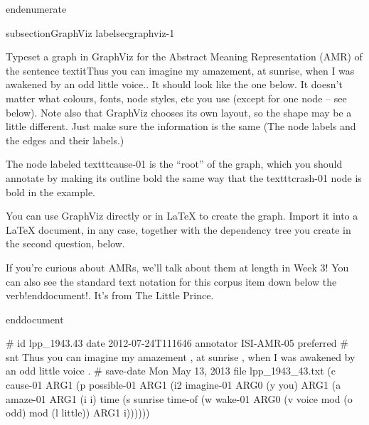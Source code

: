 end{enumerate}


subsection{GraphViz}
label{secgraphviz-1}

Typeset a graph in GraphViz for the Abstract Meaning Representation (AMR) of the sentence textit{Thus you can imagine my amazement, at sunrise, when I was awakened by an odd little voice.}. It should look  like the one below. It doesn’t matter what colours, fonts, node styles, etc you use (except for one node -- see below). Note also that GraphViz chooses its own layout, so the shape may be a little different. Just make sure the information is the same (The node labels and the edges and their labels.)

The node labeled texttt{cause-01} is the ``root'' of the graph, which you should annotate by making its outline bold the same way that the texttt{crash-01} node is bold in the example.

You can use GraphViz directly or in LaTeX{} to create the graph. Import it into a LaTeX{} document, in any case, together with the dependency tree you create in the second question, below.



If you're curious about AMRs, we'll talk about them at length in Week 3! You can also see the standard text notation for this corpus item down below the verb!end{document}!. It's from The Little Prince.


end{document}




# id lpp_1943.43 date 2012-07-24T111646 annotator ISI-AMR-05 preferred
# snt Thus you can imagine my amazement , at sunrise , when I was awakened by an odd little voice .
# save-date Mon May 13, 2013 file lpp_1943_43.txt
(c  cause-01
      ARG1 (p  possible-01
            ARG1 (i2  imagine-01
                  ARG0 (y  you)
                  ARG1 (a  amaze-01
                        ARG1 (i  i)
                        time (s  sunrise
                              time-of (w  wake-01
                                    ARG0 (v  voice
                                          mod (o  odd)
                                          mod (l  little))
                                    ARG1 i))))))


